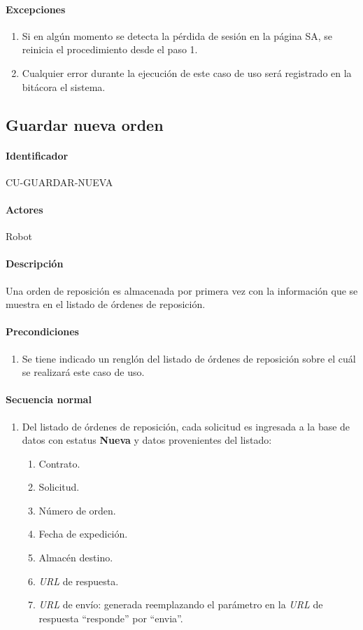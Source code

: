 \paragraph*{Excepciones}
\begin{enumerate}
  \item Si en algún momento se detecta la pérdida de sesión en la página SA, se reinicia el procedimiento desde el paso 1.
  \item Cualquier error durante la ejecución de este caso de uso será registrado en la bitácora el sistema.
\end{enumerate}


\subsection{Guardar nueva orden}
\paragraph*{Identificador}
CU-GUARDAR-NUEVA
\paragraph*{Actores}
Robot
\paragraph*{Descripción}
Una orden de reposición es almacenada por primera vez con la información que se muestra en el listado de órdenes de reposición.
\paragraph*{Precondiciones}
\begin{enumerate}
  \item Se tiene indicado un renglón del listado de órdenes de reposición sobre el cuál se realizará este caso de uso.
\end{enumerate}
\paragraph*{Secuencia normal}
\begin{enumerate}
  \item Del listado de órdenes de reposición, cada solicitud es ingresada a la base de datos con estatus \textbf{Nueva} y datos provenientes del listado:
  \begin{enumerate}
    \item Contrato.
    \item Solicitud.
    \item Número de orden.
    \item Fecha de expedición.
    \item Almacén destino.
    \item \textit{URL} de respuesta.
    \item \textit{URL} de envío: generada reemplazando el parámetro en la \textit{URL} de respuesta ``responde'' por ``envia''.
  \end{enumerate}
\end{enumerate}
